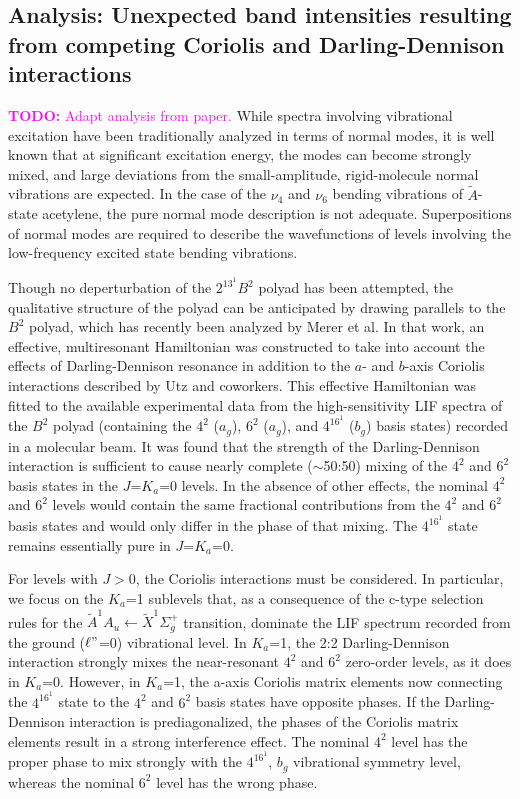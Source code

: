 \documentclass[12pt,draft]{mitthesis}
\newcommand{\TODO} [1]{\textcolor{magenta}{\textbf{TODO:} #1}}
\newcommand{\POINT}[1]{\textcolor{magenta}{#1}}
\begin{document}

\subsection{Analysis: Unexpected band intensities resulting from
  competing Coriolis and Darling-Dennison interactions}

\TODO{Adapt analysis from paper.}  While spectra involving vibrational
excitation have been traditionally analyzed in terms of normal modes,
it is well known that at significant excitation energy, the modes can
become strongly mixed, and large deviations from the small-amplitude,
rigid-molecule normal vibrations are expected.  In the case of the
$\nu_4$ and $\nu_6$ bending vibrations of $\tilde{A}$-state acetylene,
the pure normal mode description is not adequate. Superpositions of
normal modes are required to describe the wavefunctions of levels
involving the low-frequency excited state bending vibrations.

Though no deperturbation of the $2^13^1B^2$ polyad has been attempted,
the qualitative structure of the polyad can be anticipated by drawing
parallels to the $B^2$ polyad, which has recently been analyzed by
Merer et al.  In that work, an effective, multiresonant Hamiltonian
was constructed to take into account the effects of Darling-Dennison
resonance in addition to the $a$- and $b$-axis Coriolis interactions
described by Utz and coworkers.  This effective Hamiltonian was fitted
to the available experimental data from the high-sensitivity LIF
spectra of the $B^2$ polyad (containing the $4^2$ ($a_g$), $6^2$
($a_g$), and $4^16^1$ ($b_g$) basis states) recorded in a molecular
beam. It was found that the strength of the Darling-Dennison
interaction is sufficient to cause nearly complete ($\sim$50:50)
mixing of the $4^2$ and $6^2$ basis states in the $J$=$K_a$=0
levels. In the absence of other effects, the nominal $4^2$ and $6^2$
levels would contain the same fractional contributions from the $4^2$
and $6^2$ basis states and would only differ in the phase of that
mixing.  The $4^16^1$ state remains essentially pure in $J$=$K_a$=0.

For levels with $J>0$, the Coriolis interactions must be
considered. In particular, we focus on the $K_a$=1 sublevels that, as
a consequence of the c-type selection rules for the $\tilde{A}^1A_u
\leftarrow \tilde{X} ^1\Sigma_g^+$ transition, dominate the LIF
spectrum recorded from the ground ($\ell"$=0) vibrational level. In
$K_a$=1, the 2:2 Darling-Dennison interaction strongly mixes the
near-resonant $4^2$ and $6^2$ zero-order levels, as it does in
$K_a$=0. However, in $K_a$=1, the a-axis Coriolis matrix elements now
connecting the $4^16^1$ state to the $4^2$ and $6^2$ basis states have
opposite phases. If the Darling-Dennison interaction is
prediagonalized, the phases of the Coriolis matrix elements result in
a strong interference effect. The nominal $4^2$ level has the proper
phase to mix strongly with the $4^16^1$, $b_g$ vibrational symmetry
level, whereas the nominal $6^2$ level has the wrong phase.
\end{document}
